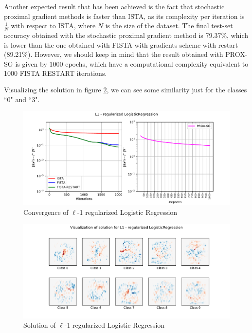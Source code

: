 \documentclass[12pt]{article}
\begin{document}
Another expected result that has been achieved is the fact that stochastic proximal gradient methods is faster than ISTA, as its complexity per iteration is $\frac{1}{N}$ with respect to ISTA, where $N$ is the size of the dataset. The final test-set accuracy obtained with the stochastic proximal gradient method is 79.37\%, which is lower than the one obtained with FISTA with gradients scheme with restart (89.21\%). However, we should keep in mind that the result obtained with PROX-SG is given by 1000 epochs, which have a computational complexity equivalent to 1000 FISTA RESTART iterations.

Visualizing the solution in figure \ref{fig:l1-solution}, we can see some similarity just for the classes ``0" and ``3".

\begin{figure}[H]
    \centering
    \includegraphics[width=17cm]{hw3/codes/exercise1/results/l1.pdf}
    \caption{Convergence of $\ell$-1 regularized Logistic Regression}
    \label{fig:l1-convergence}
\end{figure}

\begin{figure}[H]
    \centering
    \includegraphics[width=17cm]{hw3/codes/exercise1/results/l1-numbers.pdf}
    \caption{Solution of $\ell$-1 regularized Logistic Regression}
    \label{fig:l1-solution}
\end{figure}
\end{document}
